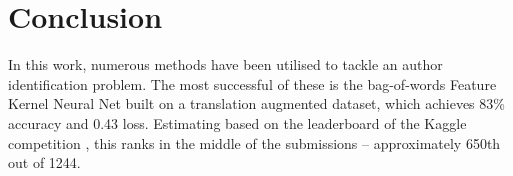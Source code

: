 \section{Conclusion}
\label{sec:conclusion}
In this work, numerous methods have been utilised to tackle an author identification problem. The most successful of these is the bag-of-words Feature Kernel Neural Net built on a translation augmented dataset, which achieves 83\% accuracy and 0.43 loss. Estimating based on the leaderboard of the Kaggle competition \cite{kaggle}, this ranks in the middle of the submissions -- approximately 650th out of 1244.